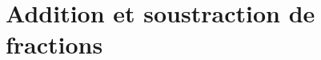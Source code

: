 \documentclass[12pt,a4paper]{article}
\date{}
\title{}
\begin{document}





%

%
%
%
%
%
%



%

\setcounter{section}{4}

\section{Addition et soustraction de fractions}


\end{document}
